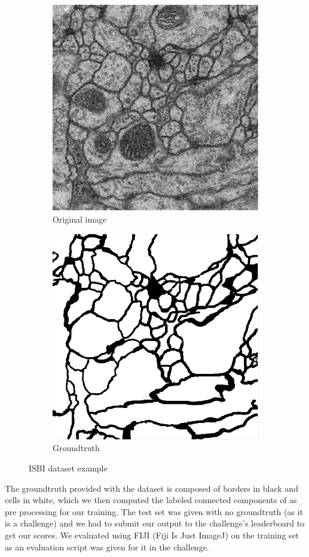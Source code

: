 \begin{figure}[!htbp]
    \centering
	\begin{subfigure}[t]{0.31\textwidth}
        \centering
        \includegraphics[height=0.7\textwidth]{./images/isbi_orig_1.png}
        \caption{Original image}
    \end{subfigure}%
    \begin{subfigure}[t]{0.31\textwidth}
        \centering
        \includegraphics[height=0.7\textwidth]{./images/isbi_gt_1.png}
        \caption{Groundtruth}
    \end{subfigure}
    \caption{ISBI dataset example}
	\label{fig:isbi_example}
\end{figure}

The groundtruth provided with the dataset is composed of borders in black and
cells in white, which we then computed the labeled connected components of as pre
processing for our training.
The test set was given with no groundtruth (as it is a challenge) and we had to
submit our output to the challenge's leaderboard to get our scores.
We evaluated using FIJI (Fiji Is Just ImageJ) on the training set as an evaluation script was given
for it in the challenge.\\

